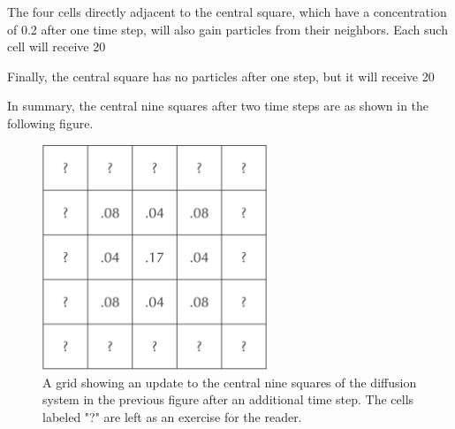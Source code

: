 {The four cells directly adjacent to the central square, which have a concentration of 0.2 after one time step, will also gain particles from their neighbors. Each such cell will receive 20%

Finally, the central square has no particles after one step, but it will receive 20%

In summary, the central nine squares after two time steps are as shown in the following figure.

\begin{figure}[h]
\centering
\mySfFamily
\includegraphics[width = 0.6\textwidth]{../images/A_concentration_two_time_steps_partial.png}
\caption{A grid showing an update to the central nine squares of the diffusion system in the previous figure after an additional time step. The cells labeled "?" are left as an exercise for the reader.}
\label{fig:A_concentration_two_time_steps_partial}
\end{figure}

\begin{qbox}\end{qbox}


}
